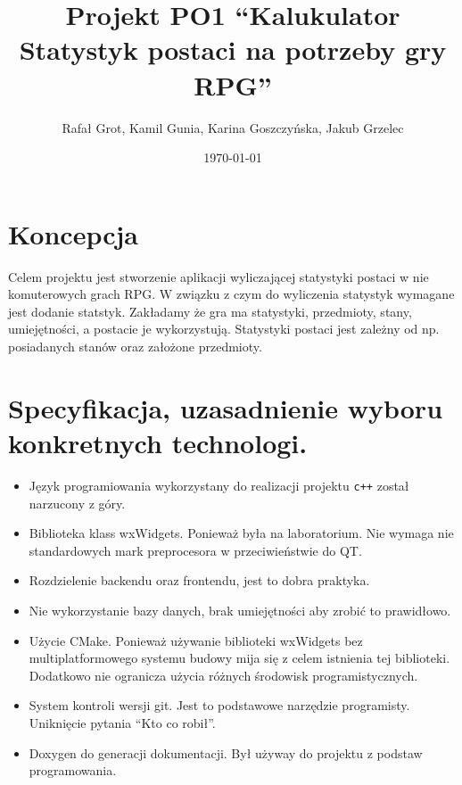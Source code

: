 \documentclass[11pt]{article}
\author{Rafał Grot, Kamil Gunia, Karina Goszczyńska, Jakub Grzelec}
\date{\today}
\title{Projekt PO1 ``Kalukulator Statystyk postaci na potrzeby gry RPG''}
\begin{document}
\maketitle
\newpage

\section{Koncepcja}
\label{sec:org2c25529}
Celem projektu jest stworzenie aplikacji wyliczającej statystyki postaci w nie komuterowych grach RPG.
W związku z czym do wyliczenia statystyk wymagane jest dodanie statstyk.
Zakładamy że gra ma statystyki, przedmioty, stany, umiejętności, a postacie je wykorzystują.
Statystyki postaci jest zależny od np. posiadanych stanów oraz założone przedmioty.
\section{Specyfikacja, uzasadnienie wyboru konkretnych technologi.}
\label{sec:org499a41a}
\begin{itemize}
\item Język programiowania wykorzystany do realizacji projektu \texttt{c++} został narzucony z góry.
\item Biblioteka klass wxWidgets. Ponieważ była na laboratorium. Nie wymaga nie standardowych mark preprocesora w przeciwieństwie do QT.
\item Rozdzielenie backendu oraz frontendu, jest to dobra praktyka.
\item Nie wykorzystanie bazy danych, brak umiejętności aby zrobić to prawidłowo.
\item Użycie CMake. Ponieważ używanie biblioteki wxWidgets bez multiplatformowego systemu budowy mija się z celem istnienia tej biblioteki. Dodatkowo nie ogranicza użycia różnych środowisk programistycznych.
\item System kontroli wersji git. Jest to podstawowe narzędzie programisty. Uniknięcie pytania ``Kto co robił''.
\item Doxygen do generacji dokumentacji. Był używay do projektu z podstaw programowania.
\end{itemize}
\end{document}

